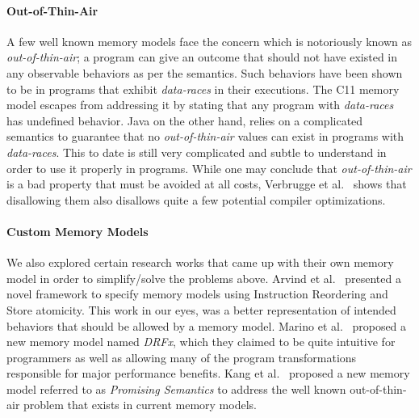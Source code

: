     \paragraph{Out-of-Thin-Air }
    A few well known memory models face the concern which is notoriously known as \textit{out-of-thin-air}; a program can give an outcome that should not have existed in any observable behaviors as per the semantics. %
    Such behaviors have been shown to be in programs that exhibit \textit{data-races} in their executions.
    The C11 memory model \cite{C11MM} escapes from addressing it by stating that any program with \textit{data-races} has undefined behavior.
    Java on the other hand, relies on a complicated semantics to guarantee that no \textit{out-of-thin-air} values can exist in programs with \textit{data-races}. This to date is still very complicated and subtle to understand in order to use it properly in programs. 
    While one may conclude that \textit{out-of-thin-air} is a bad property that must be avoided at all costs, Verbrugge et al.~\cite{Verbrugge} shows that disallowing them also disallows quite a few potential compiler optimizations.

    \paragraph{Custom Memory Models}
    We also explored certain research works that came up with their own memory model in order to simplify/solve the problems above. 
    Arvind et al.~\cite{Arvind} presented a novel framework to specify memory models using Instruction Reordering and Store atomicity. This work in our eyes, was a better representation of intended behaviors that should be allowed by a memory model. 
    Marino et al.~\cite{Marino} proposed a new memory model named \textit{DRFx}, which they claimed to be quite intuitive for programmers as well as allowing many of the program transformations responsible for major performance benefits.
    Kang et al.~\cite{Kang} proposed a new memory model referred to as \textit{Promising Semantics} to address the well known out-of-thin-air problem that exists in current memory models. 